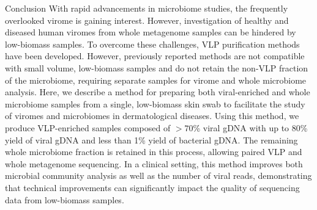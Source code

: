 \documentclass[oneside,12pt,final]{sty/ucthesis-CA2012}
\begin{document}
\begin{mainmatter}
\begin{section}{Conclusion}
With rapid advancements in microbiome studies, the frequently overlooked virome is gaining interest. However, investigation of healthy and diseased human viromes from whole metagenome samples can be hindered by low-biomass samples. To overcome these challenges, VLP purification methods have been developed. However, previously reported methods are not compatible with small volume, low-biomass samples and do not retain the non-VLP fraction of the microbiome, requiring separate samples for virome and whole microbiome analysis. Here, we describe a method for preparing both viral-enriched and whole microbiome samples from a single, low-biomass skin swab to facilitate the study of viromes and microbiomes in dermatological diseases. Using this method, we produce VLP-enriched samples composed of $> 70$\% viral gDNA with up to 80\% yield of viral gDNA and less than 1\% yield of bacterial gDNA. The remaining whole microbiome fraction is retained in this process, allowing paired VLP and whole metagenome sequencing. In a clinical setting, this method improves both microbial community analysis as well as the number of viral reads, demonstrating that technical improvements can significantly impact the quality of sequencing data from low-biomass samples.
\end{section}


\end{mainmatter}
\end{document}

